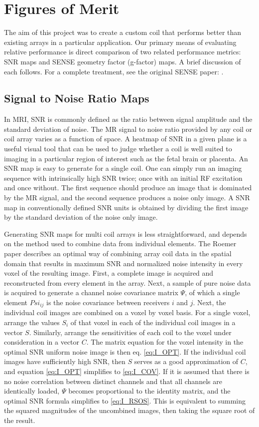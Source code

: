 \chapter{Figures of Merit}
The aim of this project was to create a custom coil that performs better than existing arrays in a
particular application. Our primary means of evaluating relative performance is direct comparison of two related
performance metrics: SNR maps and SENSE geometry factor (g-factor) maps. A brief discussion of each follows. For a
complete treatment, see the original SENSE paper: \cite{Pruessmann1999}.

\section{Signal to Noise Ratio Maps}
In MRI, SNR is commonly defined as the ratio between signal amplitude and the standard deviation of noise. The MR signal
to noise ratio provided by any coil or coil array varies as a function of space. A heatmap of SNR in a given plane is a
useful visual tool that can be used to judge whether a coil is well suited to imaging in a particular region of interest
such as the fetal brain or placenta. An SNR map is easy to generate for a single coil. One can simply run an imaging
sequence with intrinsically high SNR twice; once with an initial RF excitation and once without. The first sequence
should produce an image that is dominated by the MR signal, and the second sequence produces a noise only image. A SNR
map in conventionally defined SNR units is obtained by dividing the first image by the standard deviation of the noise
only image.

Generating SNR maps for multi coil arrays is less straightforward, and depends on the method used to combine data from
individual elements. The Roemer paper \cite{Roemer90} describes an optimal way of combining array coil data in the
spatial domain that results in maximum SNR and normalized noise intensity in every voxel of the resulting image.  First,
a complete image is acquired and reconstructed from every element in the array. Next, a sample of pure noise data is
acquired to generate a channel noise covariance matrix $\Psi$, of which a single element $Psi_{ij}$ is the noise
covariance between receivers $i$ and $j$. Next, the individual coil images are combined on a voxel by voxel basis. For a
single voxel, arrange the values $S_i$ of that voxel in each of the individual coil images in a vector $S$.  Similarly,
arrange the sensitivities of each coil to the voxel under consideration in a vector $C$. The matrix equation for the
voxel intensity in the optimal SNR uniform noise image is then eq. \ref{eq:I_OPT}. If the individual coil images have
sufficiently high SNR, then $S$ serves as a good approximation of $C$, and equation \ref{eq:I_OPT} simplifies to \ref{eq:I_COV}.  If it
is assumed that there is no noise correlation between distinct channels and that all channels are identically loaded,
$\Psi$ becomes proportional to the identity matrix, and the optimal SNR formula simplifies to \ref{eq:I_RSOS}. This is
equivalent to summing the squared magnitudes of the uncombined images, then taking the square root of the result.

